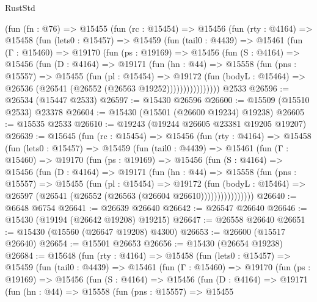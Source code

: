 \begin{lexlean}{RustStd}
\begin{coremodule}
{\begin{coremodule}
{{{{{{{{{{{{{{{{{{{{{{{{{{{{{{{{{{{{{{{{{{{{{{{{{{{{{{{{{{{{    (fun (fn : @76) =>
    @15455
      (fun (rc : @15454) =>
      @15456
        (fun (rty : @4164) =>
        @15458
          (fun (lets0 : @15457) =>
          @15459
            (fun (tail0 : @4439) =>
            @15461
              (fun (Γ : @15460) =>
              @19170
                (fun (ps : @19169) =>
                @15456
                  (fun (S : @4164) =>
                  @15456
                    (fun (D : @4164) =>
                    @19171
                      (fun (hn : @44) =>
                      @15558
                        (fun (pns : @15557) =>
                        @15455
                          (fun (pl : @15454) =>
                          @19172
                            (fun (bodyL : @15464) =>
                            @26536 (@26541 (@26552 (@26563 @19252))))))))))))))))
    @2533
@26596 := @26534 (@15447 @2533)
@26597 := @15430 @26596
@26600 := @15509 (@15510 @2533) @23378
@26604 := @15430 (@15501 (@26600 @19234) @19238)
@26605 := @15535 @2533
@26610 := @19243 (@19244 @26605 @23381 @19205 @19207)
@26639 := @15645
    (fun (rc : @15454) =>
    @15456
      (fun (rty : @4164) =>
      @15458
        (fun (lets0 : @15457) =>
        @15459
          (fun (tail0 : @4439) =>
          @15461
            (fun (Γ : @15460) =>
            @19170
              (fun (ps : @19169) =>
              @15456
                (fun (S : @4164) =>
                @15456
                  (fun (D : @4164) =>
                  @19171
                    (fun (hn : @44) =>
                    @15558
                      (fun (pns : @15557) =>
                      @15455
                        (fun (pl : @15454) =>
                        @19172
                          (fun (bodyL : @15464) =>
                          @26597 (@26541 (@26552 (@26563 (@26604 @26610))))))))))))))))
@26640 := @6648 @6754
@26641 := @26639 @26640
@26642 := @26547 @26640
@26646 := @15430 (@19194 (@26642 @19208) @19215)
@26647 := @26558 @26640
@26651 := @15430 (@15560 (@26647 @19208) @4300)
@26653 := @26600 (@15517 @26640)
@26654 := @15501 @26653
@26656 := @15430 (@26654 @19238)
@26684 := @15648
    (fun (rty : @4164) =>
    @15458
      (fun (lets0 : @15457) =>
      @15459
        (fun (tail0 : @4439) =>
        @15461
          (fun (Γ : @15460) =>
          @19170
            (fun (ps : @19169) =>
            @15456
              (fun (S : @4164) =>
              @15456
                (fun (D : @4164) =>
                @19171
                  (fun (hn : @44) =>
                  @15558
                    (fun (pns : @15557) =>
                    @15455
}}}}}}}}}}}}}}}}}}}}}}}}}}}}}}}}}}}}}}}}}}}}}}}}}}}}}}}}}}}}
\end{coremodule}}
\end{coremodule}
\end{lexlean}

